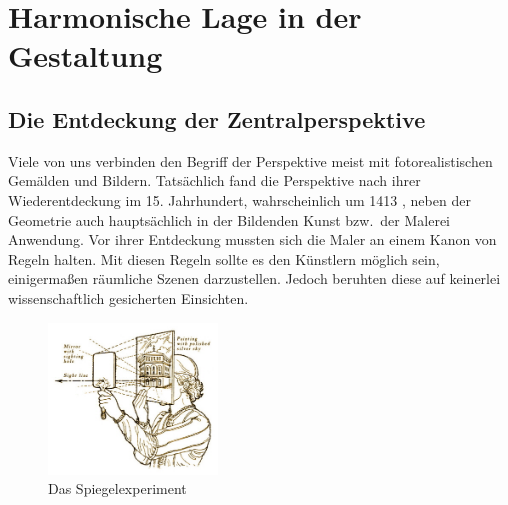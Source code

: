 \documentclass[12pt,a4paper]{article}
\begin{document}
\newpage
\section{Harmonische Lage in der Gestaltung}


\subsection{Die Entdeckung der Zentralperspektive}
\label{subsec:harmMalerei}

Viele von uns verbinden den Begriff der Perspektive meist mit fotorealistischen Gemälden und Bildern. Tatsächlich fand die Perspektive nach ihrer Wiederentdeckung im 15. Jahrhundert, wahrscheinlich um 1413 \citep[S.~27]{perspektive}, neben der Geometrie auch hauptsächlich in der Bildenden Kunst bzw.~der Malerei Anwendung. Vor ihrer Entdeckung mussten sich die Maler an einem Kanon von Regeln halten. Mit diesen Regeln sollte es den Künstlern möglich sein, einigermaßen räumliche Szenen darzustellen. Jedoch beruhten diese auf keinerlei wissenschaftlich gesicherten Einsichten.

\begin{figure}
\centering
\includegraphics[width=0.4\textwidth]{Bilder/Brunelleschi-Zentralperspektive.jpg}
\caption{Das  Spiegelexperiment\protect\footnotemark[3]}%
\label{fig:brunnelli1}
\end{figure}

\end{document}
